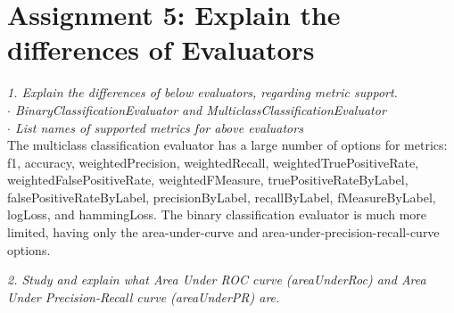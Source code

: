 \documentclass[]{article}
\begin{document}
\section*{Assignment 5: Explain the differences of Evaluators}
\emph{1. Explain the differences of below evaluators, regarding metric support. } \\
\emph{$\cdot$ BinaryClassificationEvaluator and MulticlassClassificationEvaluator} \\
\emph{$\cdot$ List names of supported metrics for above evaluators} \\

The multiclass classification evaluator has a large number of options for metrics: 
f1,
accuracy,
weightedPrecision,
weightedRecall,
weightedTruePositiveRate, 
weightedFalsePositiveRate, 
weightedFMeasure, 
truePositiveRateByLabel, 
falsePositiveRateByLabel, 
precisionByLabel, 
recallByLabel, 
fMeasureByLabel, 
logLoss, 
and hammingLoss.
The binary classification evaluator is much more limited, having only the 
area-under-curve and area-under-precision-recall-curve options.




\emph{2. Study and explain what Area Under ROC curve (areaUnderRoc) and Area Under Precision-Recall curve (areaUnderPR) are. }
\end{document}
